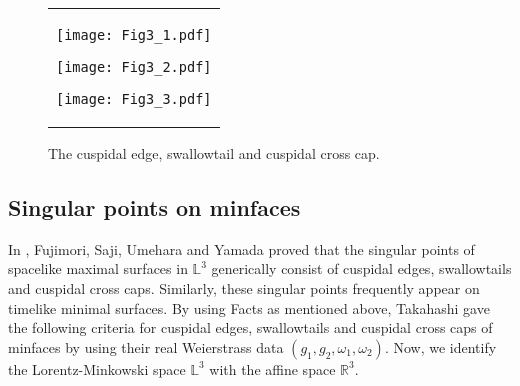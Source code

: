 \documentclass[11pt,reqno]{amsart}
\theoremstyle{plain} %
\theoremstyle{definition}
\begin{document}
\begin{figure}[!h]
\begin{center}
\begin{tabular}{c}
\begin{minipage}{0.4\hsize}
\begin{center}
\vspace{-1.7cm}
\texttt{[image: Fig3\_1.pdf]}
\vspace{0.5cm}
\end{center}
\end{minipage}
\hspace{-1.7cm}
\begin{minipage}{0.4\hsize}
\begin{center}
\vspace{-3.0cm}
\texttt{[image: Fig3\_2.pdf]}
\vspace{0cm}
\hspace{-1.1cm}
\end{center}
\end{minipage}
\hspace{-0.5cm}
\begin{minipage}{0.4\hsize}
\begin{center}
\vspace{-1.8cm}
\texttt{[image: Fig3\_3.pdf]}
\vspace{0.3cm}
\end{center}
\end{minipage}

\end{tabular}
\end{center}
\vspace{-0.2cm}
\caption{The cuspidal edge, swallowtail and cuspidal cross cap.}\label{Fig3}

\end{figure}

\subsection{Singular points on minfaces}
In \cite{FSUY}, Fujimori, Saji, Umehara and Yamada proved that the singular points of spacelike maximal surfaces in $\mathbb{L}^3$ generically consist of cuspidal edges, swallowtails and cuspidal cross caps. Similarly, these singular points frequently appear on timelike minimal surfaces. By using Facts as mentioned above, Takahashi gave the following criteria for cuspidal edges, swallowtails and cuspidal cross caps of minfaces by using their real Weierstrass data $(g_1, g_2,\omega_1, \omega_2)$. Now, we identify the Lorentz-Minkowski space $\mathbb{L}^3$ with the affine space $\mathbb{R}^3$.
\end{document}
